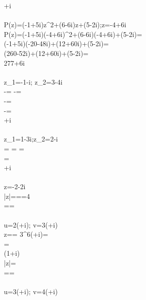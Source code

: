 +i
\\\Large{}\normalsize\\
P(z)=(-1+5i)z^2+(6-6i)z+(5-2i);z=-4+6i\\
P(z)=(-1+5i)(-4+6i)^2+(6-6i)(-4+6i)+(5-2i)=\\
(-1+5i)(-20-48i)+(12+60i)+(5-2i)=\\
(260-52i)+(12+60i)+(5-2i)=\\
277+6i
\\\Large{}\normalsize\\
z_1=-1-i; z_2=3-4i\\
-=
-=\\
-=\\
-=\\
+i
\\\Large{}\normalsize\\
z_1=1-3i;z_2=2-i\\
=
=
=\\
=\\
+i
\\\Large{}\normalsize\\
z=-2-2i\\
|z|===4\\
==
\\\Large{}\normalsize\\
u=2(+i);
v=3(+i)\\
z==
{3^6(\cos{-3\pi}+i\sin{-3\pi})}=\\
=\\
(1+i)\\
|z|=\\
==
\\\Large{}\normalsize\\
u=3(+i);
v=4(+i)\\
